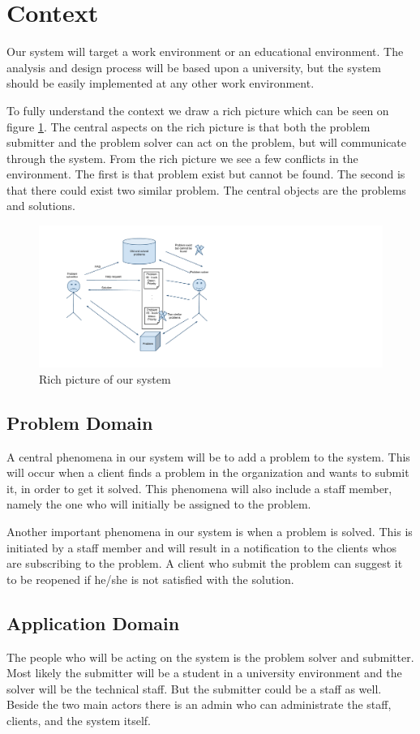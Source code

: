 \section{Context}
Our system will target a work environment or an educational environment.
The analysis and design process will be based upon a university, but the system should be easily implemented at any other work environment. 

To fully understand the context we draw a rich picture which can be seen on figure \ref{fig:rich_picture}. 
The central aspects on the rich picture is that both the problem submitter and the problem solver can act on the problem, but will communicate through the system. 
From the rich picture we see a few conflicts in the environment. 
The first is that problem exist but cannot be found.
The second is that there could exist two similar problem.
The central objects are the problems and solutions.

\begin{figure}%
\includegraphics[scale = 0.45]{input/background/rich_picture.pdf}%
\caption{Rich picture of our system}%
\label{fig:rich_picture}%
\end{figure}

\subsection{Problem Domain}
A central phenomena in our system will be to add a problem to the system.
This will occur when a client finds a problem in the organization and wants to submit it, in order to get it solved.
This phenomena will also include a staff member, namely the one who will initially be assigned to the problem.

Another important phenomena in our system is when a problem is solved.
This is initiated by a staff member and will result in a notification to the clients whos are subscribing to the problem.
A client who submit the problem can suggest it to be reopened if he/she is not satisfied with the solution.

\subsection{Application Domain}
The people who will be acting on the system is the problem solver and submitter. Most likely the submitter will be a student in a university environment and the solver will be the technical staff. But the submitter could be a staff as well. Beside the two main actors there is an admin who can administrate the staff, clients, and the system itself. 